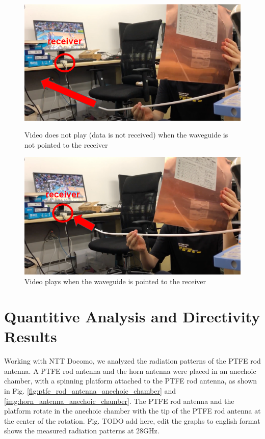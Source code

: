 \documentclass[a4paper,12pt]{report}
\begin{document}
\begin{figure}
  \centering
  \begin{minipage}{0.45\textwidth}
    \centering
    \includegraphics[clip, keepaspectratio, width=0.9\linewidth]{img/qualitative_waveguide_not_pointed.png}
    \caption{Video does not play (data is not received) when the waveguide is not pointed to the receiver}
    \label{img:qualitative_waveguide_not_pointed}
  \end{minipage}\hfill
  \begin{minipage}{0.45\textwidth}
    \centering
    \includegraphics[clip, keepaspectratio, width=0.9\linewidth]{img/qualitative_waveguide_pointed.png}
    \caption{Video plays when the waveguide is pointed to the receiver}
    \label{img:qualitative_waveguide_pointed}
  \end{minipage}\hfill
\end{figure}

\section{Quantitive Analysis and Directivity Results}

Working with NTT Docomo,
we analyzed the radiation patterns of the PTFE rod antenna.
A PTFE rod antenna and the horn antenna were placed in
an anechoic chamber, with a spinning platform attached to the PTFE rod antenna,
as shown in Fig. \ref{fig:ptfe_rod_antenna_anechoic_chamber}
and \ref{img:horn_antenna_anechoic_chamber}.
The PTFE rod antenna and the platform rotate in the anechoic chamber
with the tip of the PTFE rod antenna at the center of the rotation.
Fig. TODO add here, edit the graphs to english format shows the measured radiation patterns at 28GHz.
\end{document}

